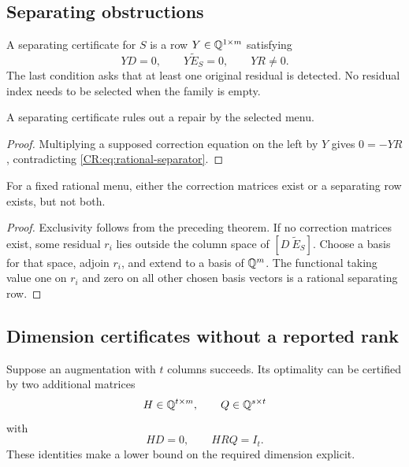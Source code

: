 \subsection{Separating obstructions}
\begin{CRdefinition}
A separating certificate for $S$ is a row $Y\in\mathbb{Q}^{1\times m}$ satisfying
\begin{equation}\label{CR:eq:rational-separator}
 YD=0,\qquad Y\widetilde E_S=0,\qquad YR\ne0.
\end{equation}
The last condition asks that at least one original residual is detected. No residual index needs to be selected when the family is empty.
\end{CRdefinition}

\begin{CRtheorem}\label{CR:thm:rational-separation}
A separating certificate rules out a repair by the selected menu.
\end{CRtheorem}
\begin{proof}
Multiplying a supposed correction equation on the left by $Y$ gives $0=-YR$, contradicting \eqref{CR:eq:rational-separator}.
\end{proof}

\begin{CRproposition}\label{CR:prop:rational-alternative}
For a fixed rational menu, either the correction matrices exist or a separating row exists, but not both.
\end{CRproposition}
\begin{proof}
Exclusivity follows from the preceding theorem. If no correction matrices exist, some residual $r_i$ lies outside the column space of $[D\ \widetilde E_S]$. Choose a basis for that space, adjoin $r_i$, and extend to a basis of $\mathbb{Q}^m$. The functional taking value one on $r_i$ and zero on all other chosen basis vectors is a rational separating row.
\end{proof}

\subsection{Dimension certificates without a reported rank}
Suppose an augmentation with $t$ columns succeeds. Its optimality can be certified by two additional matrices
\[
 H\in\mathbb{Q}^{t\times m},\qquad Q\in\mathbb{Q}^{s\times t}
\]
with
\begin{equation}\label{CR:eq:rational-dimension}
 HD=0,\qquad HRQ=I_t.
\end{equation}
These identities make a lower bound on the required dimension explicit.


